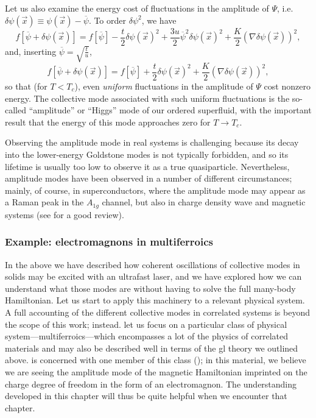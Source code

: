 Let us also examine the energy cost of fluctuations in the amplitude of $\Psi$, i.e. $\delta \psi(\vec{x}) \equiv \psi(\vec{x})-\overline{\psi}$.
To order $\delta \psi^2$, we have
\begin{equation}
f[\overline{\psi}+\delta\psi(\vec{x})] = f[\overline{\psi}]-\frac{t}{2}\delta\psi(\vec{x})^2+\frac{3u}{2}\overline{\psi}^2\delta\psi(\vec{x})^2+\frac{K}{2}(\nabla \delta \psi(\vec{x}))^2,
\end{equation}
and, inserting $\overline{\psi} = \sqrt{\frac{t}{u}}$,
\begin{equation}
f[\overline{\psi}+\delta\psi(\vec{x})] = f[\overline{\psi}]+\frac{t}{2}\delta\psi(\vec{x})^2+\frac{K}{2}(\nabla \delta \psi(\vec{x}))^2,
\end{equation}
so that (for $T<T_c$), even \emph{uniform} fluctuations in the amplitude of $\Psi$ cost nonzero energy.
The collective mode associated with such uniform fluctuations is the so-called ``amplitude'' or ``Higgs'' mode of our ordered superfluid, with the important result that the energy of this mode approaches zero for $T\rightarrow T_c$.

Observing the amplitude mode in real systems is challenging because its decay into the lower-energy Goldstone modes is not typically forbidden, and so its lifetime is usually too low to observe it as a true quasiparticle\cite{jain_higgs_2017}.
Nevertheless, amplitude modes have been observed in a number of different circumstances; mainly, of course, in superconductors, where the amplitude mode may appear as a Raman peak in the $A_{1g}$ channel\citep{measson_amplitude_2014}, but also in charge density wave\citep{wang_axial_2022} and magnetic\citep{hong_higgs_2017,jain_higgs_2017} systems (see \citet{pekker_amplitude_2015} for a good review).

\subsubsection{Example: electromagnons in multiferroics}

In the above we have described how coherent oscillations of collective modes in solids may be excited with an ultrafast laser, and we have explored how we can understand what those modes are without having to solve the full many-body Hamiltonian.
Let us start to apply this machinery to a relevant physical system.
A full accounting of the different collective modes in correlated systems is beyond the scope of this work; instead. let us focus on a particular class of physical system---multiferroics---which encompasses a lot of the physics of correlated materials and may also be described well in terms of the \gls{gl} theory we outlined above.
 is concerned with one member of this class (); in this material, we believe we are seeing the amplitude mode of the magnetic Hamiltonian imprinted on the charge degree of freedom in the form of an electromagnon.
The understanding developed in this chapter will thus be quite helpful when we encounter that chapter.

